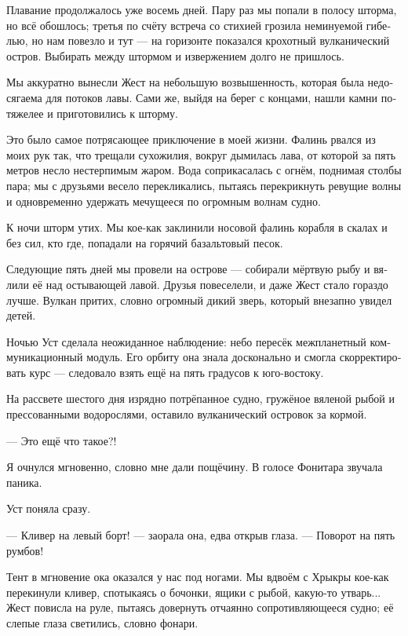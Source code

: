 \documentclass[a4paper,10pt,fleqn]{book}\usepackage{polyglossia}\setdefaultlanguage[babelshorthands=true]{russian}\setotherlanguage{english}\defaultfontfeatures{Ligatures=TeX,Mapping=tex-text}
\newcommand{\asterism}{\vspace{1em}{\centering\Large\bfseries$\ast~\ast~\ast$\par}\vspace{1em}}
\begin{document}
\asterism

Плавание продолжалось уже восемь дней.
Пару раз мы попали в полосу шторма, но всё обошлось;
третья по счёту встреча со стихией грозила неминуемой гибелью, но нам повезло и тут --- на горизонте показался крохотный вулканический остров.
Выбирать между штормом и извержением долго не пришлось.

Мы аккуратно вынесли Жест на небольшую возвышенность, которая была недосягаема для потоков лавы.
Сами же, выйдя на берег с концами, нашли камни потяжелее и приготовились к шторму.

Это было самое потрясающее приключение в моей жизни.
Фалинь рвался из моих рук так, что трещали сухожилия, вокруг дымилась лава, от которой за пять метров несло нестерпимым жаром.
Вода соприкасалась с огнём, поднимая столбы пара;
мы с друзьями весело перекликались, пытаясь перекрикнуть ревущие волны и одновременно удержать мечущееся по огромным волнам судно.

К ночи шторм утих.
Мы кое-как заклинили носовой фалинь корабля в скалах и без сил, кто где, попадали на горячий базальтовый песок.

Следующие пять дней мы провели на острове --- собирали мёртвую рыбу и вялили её над остывающей лавой.
Друзья повеселели, и даже Жест стало гораздо лучше.
Вулкан притих, словно огромный дикий зверь, который внезапно увидел детей.

Ночью Уст сделала неожиданное наблюдение: небо пересёк межпланетный коммуникационный модуль.
Его орбиту она знала досконально и смогла скорректировать курс --- следовало взять ещё на пять градусов к юго-востоку.

На рассвете шестого дня изрядно потрёпанное судно, гружёное вяленой рыбой и прессованными водорослями, оставило вулканический островок за кормой.

\asterism

--- Это ещё что такое?!

Я очнулся мгновенно, словно мне дали пощёчину.
В голосе Фонитара звучала паника.

Уст поняла сразу.

--- Кливер на левый борт! --- заорала она, едва открыв глаза.
--- Поворот на пять румбов!

Тент в мгновение ока оказался у нас под ногами.
Мы вдвоём с Хрыкры кое-как перекинули кливер, спотыкаясь о бочонки, ящики с рыбой, какую-то утварь...
Жест повисла на руле, пытаясь довернуть отчаянно сопротивляющееся судно;
её слепые глаза светились, словно фонари.
\end{document}

